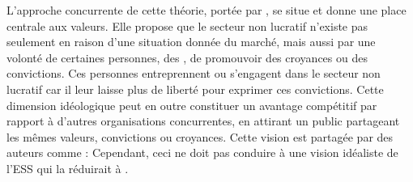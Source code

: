             L’approche concurrente de cette théorie, portée par \textcite{rose-ackerman1996altruism}, se situe  et donne une place centrale aux valeurs. Elle propose que le secteur non lucratif n’existe pas seulement en raison d’une situation donnée du marché, mais aussi par une volonté de certaines personnes, des , de promouvoir des croyances ou des convictions. Ces personnes entreprennent ou s’engagent dans le secteur non lucratif car il leur laisse plus de liberté pour exprimer ces convictions. Cette dimension idéologique peut en outre constituer un avantage compétitif par rapport à d’autres organisations concurrentes, en attirant un public partageant les mêmes valeurs, convictions ou croyances. Cette vision est partagée par des auteurs comme \textcite[][p.137]{rothschild2006centrality} :  Cependant, ceci ne doit pas conduire à une vision idéaliste de l’ESS qui la réduirait à  \parencite{laville2017conference}.\\

